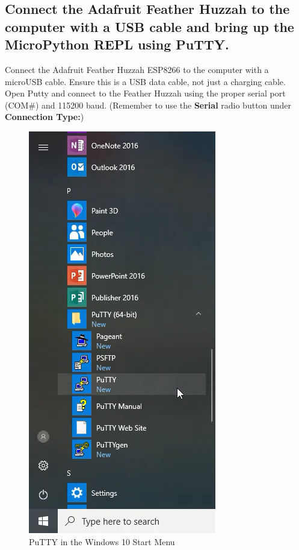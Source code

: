 \documentclass{book}
\makeatletter
\def\maxwidth{\ifdim\Gin@nat@width>\linewidth\linewidth
    \else\Gin@nat@width\fi}
\let\Oldincludegraphics\includegraphics
\renewcommand{\includegraphics}[1]{\Oldincludegraphics[width=.8\maxwidth]{#1}}
\makeatother
\begin{document}
    
        \subsection{Connect the Adafruit Feather Huzzah to the computer with a
USB cable and bring up the MicroPython REPL using
PuTTY.}\label{connect-the-adafruit-feather-huzzah-to-the-computer-with-a-usb-cable-and-bring-up-the-micropython-repl-using-putty.}
    




    
        Connect the Adafruit Feather Huzzah ESP8266 to the computer with a
microUSB cable. Ensure this is a USB data cable, not just a charging
cable. Open Putty and connect to the Feather Huzzah using the proper
serial port (COM\#) and 115200 baud. (Remember to use the
\textbf{Serial} radio button under \textbf{Connection Type:})

\begin{figure}
\centering
\includegraphics{images/putty_in_start_menu.png}
\caption{PuTTY in the Windows 10 Start Menu}
\end{figure}
\end{document}
